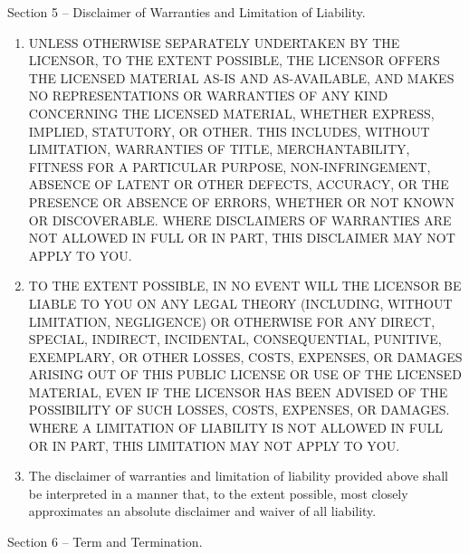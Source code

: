 \documentclass[]{scrbook}
\begin{document}
Section 5 -- Disclaimer of Warranties and Limitation of Liability.

\begin{enumerate}
\def\labelenumi{\alph{enumi}.}
\item
  UNLESS OTHERWISE SEPARATELY UNDERTAKEN BY THE LICENSOR, TO THE EXTENT
  POSSIBLE, THE LICENSOR OFFERS THE LICENSED MATERIAL AS-IS AND
  AS-AVAILABLE, AND MAKES NO REPRESENTATIONS OR WARRANTIES OF ANY KIND
  CONCERNING THE LICENSED MATERIAL, WHETHER EXPRESS, IMPLIED, STATUTORY,
  OR OTHER. THIS INCLUDES, WITHOUT LIMITATION, WARRANTIES OF TITLE,
  MERCHANTABILITY, FITNESS FOR A PARTICULAR PURPOSE, NON-INFRINGEMENT,
  ABSENCE OF LATENT OR OTHER DEFECTS, ACCURACY, OR THE PRESENCE OR
  ABSENCE OF ERRORS, WHETHER OR NOT KNOWN OR DISCOVERABLE. WHERE
  DISCLAIMERS OF WARRANTIES ARE NOT ALLOWED IN FULL OR IN PART, THIS
  DISCLAIMER MAY NOT APPLY TO YOU.
\item
  TO THE EXTENT POSSIBLE, IN NO EVENT WILL THE LICENSOR BE LIABLE TO YOU
  ON ANY LEGAL THEORY (INCLUDING, WITHOUT LIMITATION, NEGLIGENCE) OR
  OTHERWISE FOR ANY DIRECT, SPECIAL, INDIRECT, INCIDENTAL,
  CONSEQUENTIAL, PUNITIVE, EXEMPLARY, OR OTHER LOSSES, COSTS, EXPENSES,
  OR DAMAGES ARISING OUT OF THIS PUBLIC LICENSE OR USE OF THE LICENSED
  MATERIAL, EVEN IF THE LICENSOR HAS BEEN ADVISED OF THE POSSIBILITY OF
  SUCH LOSSES, COSTS, EXPENSES, OR DAMAGES. WHERE A LIMITATION OF
  LIABILITY IS NOT ALLOWED IN FULL OR IN PART, THIS LIMITATION MAY NOT
  APPLY TO YOU.
\item
  The disclaimer of warranties and limitation of liability provided
  above shall be interpreted in a manner that, to the extent possible,
  most closely approximates an absolute disclaimer and waiver of all
  liability.
\end{enumerate}

Section 6 -- Term and Termination.
\end{document}
